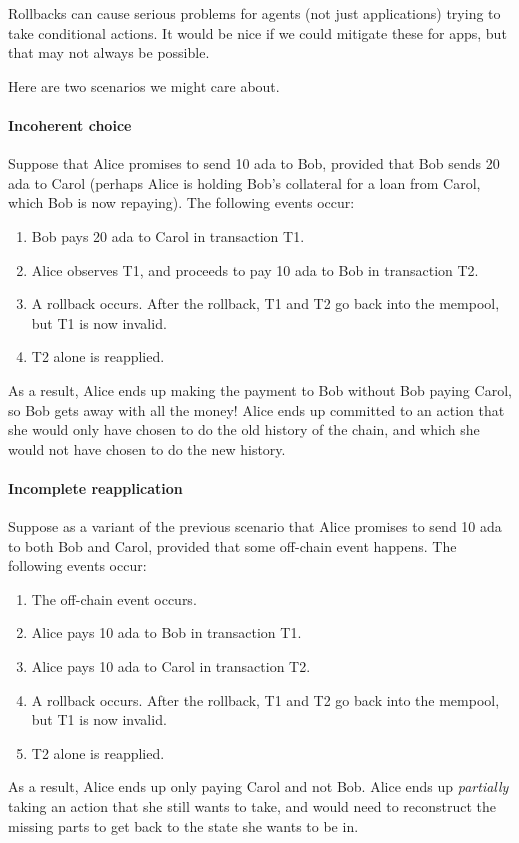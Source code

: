 \documentclass[plutus.tex]{subfiles}
\begin{document}
\begin{requirement}
\label{req:app-rollback}
Rollbacks can cause serious problems for agents (not just applications) trying to take conditional actions.
It would be nice if we could mitigate these for \glspl{app}, but that may not always be possible.

Here are two scenarios we might care about.

\paragraph{Incoherent choice}
\label{para:incoherent-choice}
Suppose that Alice promises to send 10 \gls{ada} to Bob, provided that Bob sends 20 \gls{ada} to Carol (perhaps Alice is holding Bob's collateral for a loan from Carol, which Bob is now repaying).
The following events occur:
\begin{enumerate}
\item Bob pays 20 \gls{ada} to Carol in transaction T1.
\item Alice observes T1, and proceeds to pay 10 \gls{ada} to Bob in transaction T2.
\item A rollback occurs. After the rollback, T1 and T2 go back into the mempool, but T1 is now invalid.
\item T2 alone is reapplied.
\end{enumerate}

As a result, Alice ends up making the payment to Bob without Bob paying Carol, so Bob gets away with all the money!
Alice ends up committed to an action that she would only have chosen to do the old history of the chain, and which she would not have chosen to do the new history.

\paragraph{Incomplete reapplication}
\label{para:incomplete-reapplication}
Suppose as a variant of the previous scenario that Alice promises to send 10 \gls{ada} to both Bob and Carol, provided that some off-chain event happens.
The following events occur:
\begin{enumerate}
\item The off-chain event occurs.
\item Alice pays 10 \gls{ada} to Bob in transaction T1.
\item Alice pays 10 \gls{ada} to Carol in transaction T2.
\item A rollback occurs. After the rollback, T1 and T2 go back into the mempool, but T1 is now invalid.
\item T2 alone is reapplied.
\end{enumerate}

As a result, Alice ends up only paying Carol and not Bob.
Alice ends up \emph{partially} taking an action that she still wants to take, and would need to reconstruct the missing parts to get back to the state she wants to be in.
\end{requirement}
\end{document}
